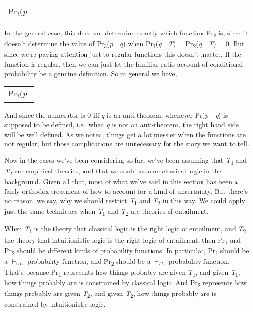 \documentclass[
  11pt,
  letterpaper,
  DIV=11,
  numbers=noendperiod,
  twoside]{scrartcl}
\begin{document}
\begin{longtable}[]{@{}l@{}}
\toprule\noalign{}
\endhead
\bottomrule\noalign{}
\endlastfoot
Pr\textsubscript{3}(\emph{p}~ \\
\end{longtable}

In the general case, this does not determine exactly which function
Pr\textsubscript{3} is, since it doesn't determine the value of
Pr\textsubscript{3}(\emph{p}~\textbar~\emph{q}) when
Pr\textsubscript{1}(\emph{q}~\textbar~\emph{T}) =
Pr\textsubscript{2}(\emph{q}~\textbar~\emph{T}) = 0. But since we're
paying attention just to regular functions this doesn't matter. If the
function is regular, then we can just let the familiar ratio account of
conditional probability be a genuine definition. So in general we have,

\begin{longtable}[]{@{}l@{}}
\toprule\noalign{}
\endhead
\bottomrule\noalign{}
\endlastfoot
Pr\textsubscript{3}(\emph{p}~ \\
\end{longtable}

And since the numerator is 0 iff \emph{q} is an anti-theorem, whenever
Pr(\emph{p}~\textbar~\emph{q}) is supposed to be defined, i.e.~when
\emph{q} is not an anti-theorem, the right hand side will be well
defined. As we noted, things get a lot messier when the functions are
not regular, but those complications are unnecessary for the story we
want to tell.

Now in the cases we've been considering so far, we've been assuming that
\emph{T}\textsubscript{1} and \emph{T}\textsubscript{2} are empirical
theories, and that we could assume classical logic in the background.
Given all that, most of what we've said in this section has been a
fairly orthodox treatment of how to account for a kind of uncertainty.
But there's no reason, we say, why we should restrict
\emph{T}\textsubscript{1} and \emph{T}\textsubscript{2} in this way. We
could apply just the same techniques when \emph{T}\textsubscript{1} and
\emph{T}\textsubscript{2} are theories of entailment.

When \emph{T}\textsubscript{1} is the theory that classical logic is the
right logic of entailment, and \emph{T}\textsubscript{2} the theory that
intuitionistic logic is the right logic of entailment, then
Pr\textsubscript{1} and Pr\textsubscript{2} should be different kinds of
probability functions. In particular, Pr\textsubscript{1} should be a
\(\vdash_{CL}\)-probability function, and Pr\textsubscript{2} should be
a \(\vdash_{IL}\)-probability function. That's because
Pr\textsubscript{1} represents how things probably are given
\emph{T}\textsubscript{1}, and given \emph{T}\textsubscript{1}, how
things probably are is constrained by classical logic. And
Pr\textsubscript{2} represents how things probably are given
\emph{T}\textsubscript{2}, and given \emph{T}\textsubscript{2}, how
things probably are is constrained by intuitionistic logic.
\end{document}

